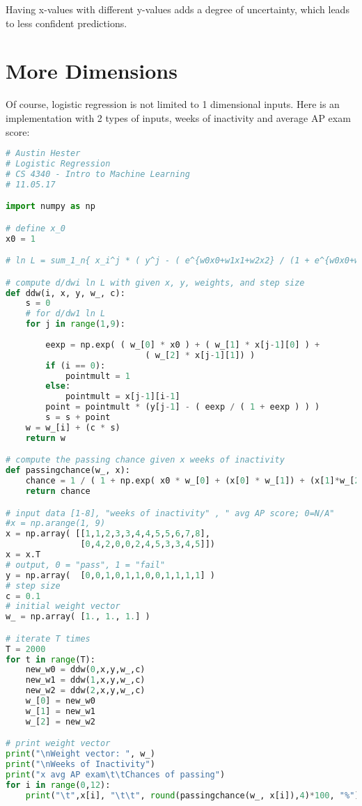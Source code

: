 \documentclass{article}
\begin{document}
Having x-values with different y-values adds a degree of uncertainty, which leads to less confident predictions. 

\newpage

\section*{More Dimensions}

Of course, logistic regression is not limited to 1 dimensional inputs. Here is an implementation with 2 types of inputs, weeks of inactivity and average AP exam score: \\

\begin{lstlisting}[breaklines=true,language=Python]
# Austin Hester
# Logistic Regression
# CS 4340 - Intro to Machine Learning
# 11.05.17

import numpy as np

# define x_0
x0 = 1

# ln L = sum_1_n{ x_i^j * ( y^j - ( e^{w0x0+w1x1+w2x2} / (1 + e^{w0x0+w1x1+w2x2} )))}

# compute d/dwi ln L with given x, y, weights, and step size
def ddw(i, x, y, w_, c):
    s = 0
    # for d/dw1 ln L
    for j in range(1,9):
        
        eexp = np.exp( ( w_[0] * x0 ) + ( w_[1] * x[j-1][0] ) +
                            ( w_[2] * x[j-1][1]) ) 
        if (i == 0):
            pointmult = 1
        else:
            pointmult = x[j-1][i-1]
        point = pointmult * (y[j-1] - ( eexp / ( 1 + eexp ) ) ) 
        s = s + point
    w = w_[i] + (c * s)
    return w

# compute the passing chance given x weeks of inactivity
def passingchance(w_, x):
    chance = 1 / ( 1 + np.exp( x0 * w_[0] + (x[0] * w_[1]) + (x[1]*w_[2])))
    return chance

# input data [1-8], "weeks of inactivity" , " avg AP score; 0=N/A"
#x = np.arange(1, 9)
x = np.array( [[1,1,2,3,3,4,4,5,5,6,7,8],
               [0,4,2,0,0,2,4,5,3,3,4,5]])
x = x.T
# output, 0 = "pass", 1 = "fail"
y = np.array(  [0,0,1,0,1,1,0,0,1,1,1,1] )
# step size
c = 0.1
# initial weight vector
w_ = np.array( [1., 1., 1.] )

# iterate T times
T = 2000
for t in range(T):
    new_w0 = ddw(0,x,y,w_,c)
    new_w1 = ddw(1,x,y,w_,c)
    new_w2 = ddw(2,x,y,w_,c)
    w_[0] = new_w0
    w_[1] = new_w1
    w_[2] = new_w2

# print weight vector
print("\nWeight vector: ", w_)
print("\nWeeks of Inactivity")
print("x avg AP exam\t\tChances of passing")
for i in range(0,12):
    print("\t",x[i], "\t\t", round(passingchance(w_, x[i]),4)*100, "%")


\end{lstlisting}
 
\end{document}
